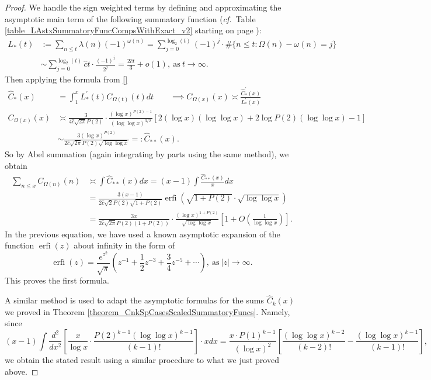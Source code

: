 \documentclass[11pt,reqno,a4letter]{article}
\numberwithin{figure}{section}
\numberwithin{table}{section}
\newcommand{\cf}{\textit{cf.\ }}
\theoremstyle{plain}
\numberwithin{theorem}{section}
\theoremstyle{definition}
\begin{document}
\begin{proof}
We handle the sign weighted terms by defining and approximating the asymptotic main term 
of the following summatory function 
(\cf Table \ref{table_LAstxSummatoryFuncCompsWithExact_v2} starting on page 
\pageref{table_LAstxSummatoryFuncCompsWithExact_v2}): 
\begin{align*} 
L_{\ast}(t) & := \sum_{n \leq t} \lambda(n) (-1)^{\omega(n)} = 
     \sum_{j=0}^{\log_2(t)} (-1)^{j} \cdot \#\{n \leq t: \Omega(n) - \omega(n) = j\} \\ 
     & \sim \sum_{j=0}^{\log_2(t)} \widehat{c}t \cdot \frac{(-1)^{j}}{2^j} = 
     \frac{2\widehat{c} t}{3} + o(1), \mathrm{\ as\ } t \rightarrow \infty. 
\end{align*} 
Then applying the formula from \eqref{} 
\begin{align*} 
\widehat{C}_{\ast}(x) & = \int_1^{x} L_{\ast}^{\prime}(t) C_{\Omega(t)}(t) dt \qquad \implies 
C_{\Omega(x)}(x) \asymp \frac{\widehat{C}_{\ast}^{\prime}(x)}{L_{\ast}^{\prime}(x)} \\ 
C_{\Omega(x)}(x) & \asymp \frac{3}{4\widehat{c} \sqrt{2\pi} P(2)} \cdot \frac{(\log x)^{P(2) - 1}}{ 
     (\log\log x)^{3/2}} \left[2(\log x)(\log\log x) + 2\log P(2) (\log\log x) - 1\right] \\ 
     & \sim \frac{3 (\log x)^{P(2)}}{2\widehat{c} \sqrt{2\pi} P(2) \sqrt{\log\log x}} 
     =: \widehat{C}_{\ast\ast}(x). 
\end{align*} 
So by Abel summation (again integrating by parts using the same method), we obtain 
\begin{align*} 
\sum_{n \leq x} C_{\Omega(n)}(n) & \asymp \int \widehat{C}_{\ast\ast}(x) dx 
     = (x-1) \int \frac{\widehat{C}_{\ast\ast}(x)}{x} dx \\ 
     & = \frac{3(x-1)}{2\widehat{c} \sqrt{2} P(2) \sqrt{1+P(2)}} 
     \operatorname{erfi}\left(\sqrt{1+P(2)} \cdot \sqrt{\log\log x}\right) \\ 
     & = 
     \frac{3x}{2\widehat{c} \sqrt{2\pi} P(2) (1 + P(2))} \cdot \frac{(\log x)^{1 + P(2)}}{ 
     \sqrt{\log\log x}}\left[
     1 + O\left(\frac{1}{\log\log x}\right)\right]. 
\end{align*} 
In the previous equation, we have used a known asymptotic expansion of the function $\operatorname{erfi}(z)$ 
about infinity in the form of \cite[\S 3.2]{INCGAMMA-BOOK} 
\[
\operatorname{erfi}(z) = \frac{e^{z^2}}{\sqrt{\pi}} \left(z^{-1} + \frac{1}{2}z^{-3} + \frac{3}{4}z^{-5} + \cdots \right), 
     \mathrm{\ as\ } |z| \rightarrow \infty. 
\]
This proves the first formula. 

A similar method is used to adapt the asymptotic formulas for the sums $\widehat{C}_k(x)$ we proved in 
Theorem \ref{theorem_CnkSpCasesScaledSummatoryFuncs}. Namely, since 
\[
(x-1) \int \frac{d^2}{dx^2}\left[\frac{x}{\log x} \cdot \frac{P(2)^{k-1} (\log\log x)^{k-1}}{(k-1)!}\right] 
     \cdot x dx = 
     \frac{x \cdot P(1)^{k-1}}{(\log x)^2} \left[ 
     \frac{(\log\log x)^{k-2}}{(k-2)!} - \frac{(\log\log x)^{k-1}}{(k-1)!}
     \right], 
\]
we obtain the stated result using a similar procedure to what we just proved above. 
\end{proof} 
\end{document}
